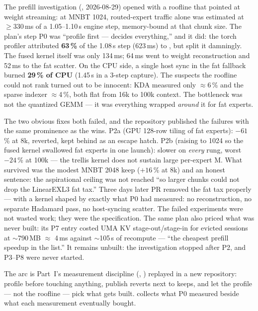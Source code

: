 \begin{hbwarstory}
The prefill investigation (, 2026-08-29)
opened with a roofline that pointed at weight streaming: at MNBT 1024,
routed-expert traffic alone was estimated at $\ge$330\,ms of a
1.05--1.10\,s engine step, memory-bound at that chunk size. The plan's step
P0 was ``profile first --- decides everything,'' and it did: the torch
profiler attributed \textbf{63\,\%} of the 1.08\,s step (623\,ms) to
, but split it damningly. The fused
 kernel itself was only 134\,ms; 64\,ms went to
 weight reconstruction and 52\,ms to the
 fat scatter. On the CPU side, a single
 host sync in the fat fallback burned
\textbf{29\,\% of CPU} (1.45\,s in a 3-step capture). The suspects the
roofline could not rank turned out to be innocent: KDA measured only
$\approx$6\,\% and the sparse indexer $\approx$4\,\%, both flat from 16k to
100k context. The bottleneck was not the quantized GEMM --- it was
everything wrapped \emph{around} it for fat experts.

The two obvious fixes both failed, and the repository published the failures with
the same prominence as the wins. P2a (GPU 128-row tiling of fat experts):
$-61$\,\% at 8k, reverted, kept behind  as an
escape hatch. P2b (raising  to 1024 so the
fused kernel swallowed fat experts in one launch): slower on \emph{every}
rung, worst $-24$\,\% at 100k --- the trellis kernel does not sustain large
per-expert M. What survived was the modest MNBT 2048 keep ($+16$\,\% at 8k)
and an honest sentence: the aspirational ceiling was not reached ``so larger
chunks could not drop the LinearEXL3 fat tax.'' Three days later PR
 removed the fat tax properly --- with a kernel shaped by
exactly what P0 had measured: no reconstruction, no separate Hadamard pass,
no host-syncing scatter. The failed experiments were not wasted work; they
were the specification. The same plan also priced what was never built: its
P7 entry costed UMA KV stage-out/stage-in for evicted sessions at
$\sim$790\,MB $\approx$ 4\,ms against $\sim$105\,s of recompute --- ``the
cheapest prefill speedup in the list.'' It remains unbuilt: the
investigation stopped after P2, and P3--P8 were never started.
\end{hbwarstory}

The arc is Part~I's measurement discipline (,
) replayed in a new repository: profile before touching anything,
publish reverts next to keeps, and let the profile --- not the roofline ---
pick what gets built.  collects what P0 measured beside
what each measurement eventually bought.

